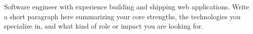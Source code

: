 Software engineer with experience building and shipping web applications. Write a short paragraph here summarizing your core strengths, the technologies you specialize in, and what kind of role or impact you are looking for.
